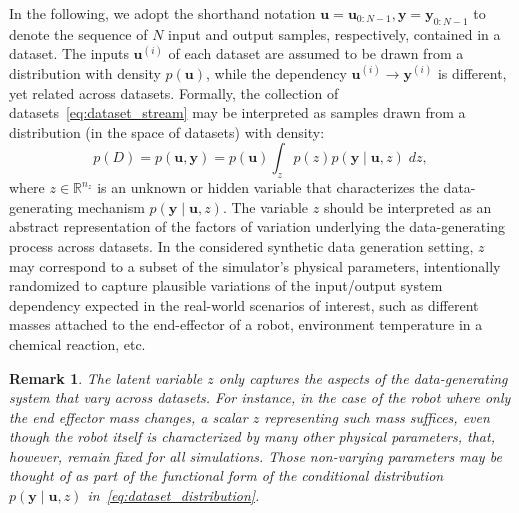 \documentclass{article}
\newcommand{\ii}{{(i)}}
\newcommand{\seq}[1]{{\mathbf{#1}}}
\newcommand{\R}{\mathbb{R}}
\newcommand{\latent}{z}
\newtheorem{remark}{Remark}
\begin{document}
In the following, we adopt the shorthand notation $\seq u=\seq u_{0:N-1}, \seq y = \seq y_{0:N-1}$ to denote the sequence of $N$ input and output samples, respectively, contained in a dataset.
The inputs $\seq u^\ii$ of each dataset are assumed to be drawn from a distribution with density $p(\seq u)$, while the dependency
$\seq u^\ii \rightarrow \seq y^\ii$
is different, yet related across datasets.
Formally, the collection of datasets~\eqref{eq:dataset_stream} may be interpreted as samples drawn from a distribution (in the space of datasets) with density:
\begin{equation}
\label{eq:dataset_distribution}
p(D) = p(\seq{u}, \seq{y}) = p(\seq{u})
\int_\latent p(\latent)
p(\seq{y} \mid \seq{u}, \latent) \; d\latent,
\end{equation}
where $\latent \in \R^{n_\latent}$ is an unknown or hidden variable that characterizes the data-generating mechanism $p(\seq{y} \mid \seq{u}, \latent)$. The  variable $\latent$  should be interpreted as an abstract representation of the factors of variation underlying the
data-generating process across datasets.
In the considered synthetic data generation setting, $\latent$ may correspond to a subset of the simulator's physical parameters, intentionally randomized to capture plausible variations of the input/output system dependency expected in the real-world scenarios of interest, such as
different masses attached to the end-effector of a robot, environment temperature in a chemical reaction,  etc.

\begin{remark}\label{rem:latent}
The latent variable $\latent$ only captures the aspects of the data-generating system that vary across datasets.
For instance, in the case of the robot where only the end effector mass changes, a scalar $\latent$ representing such mass suffices, even though the robot itself is characterized by many other physical parameters, that, however, remain fixed for all simulations. Those non-varying parameters may be thought of as part of the functional form of the conditional distribution $p(\seq{y} \mid \seq{u}, \latent)$ in~\eqref{eq:dataset_distribution}.
\end{remark}
\end{document}
